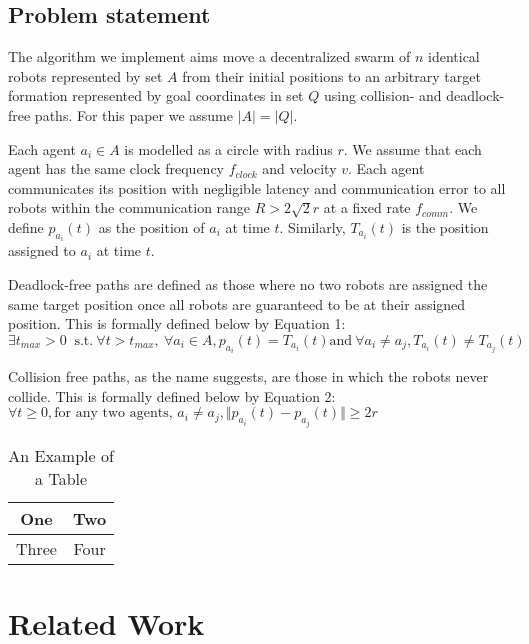 \subsection{Problem statement}

The algorithm we implement aims move a decentralized swarm of $n$ identical robots represented by set $A$ from their initial positions to an arbitrary target formation represented by goal coordinates in set $Q$ using collision- and deadlock-free paths. For this paper we assume $|A| = |Q|$.

Each agent $a_{i} \in A$ is modelled as a circle with radius $r$. We assume that each agent has the same clock frequency $f_{clock}$ and velocity $v$. Each agent communicates its position with negligible latency and communication error to all robots within the communication range $R > 2\sqrt{2}r$ at a fixed rate $f_{comm}$. We define $p_{a_{i}}(t)$ as the position of $a_i$ at time $t$. Similarly, $T_{a_{i}}(t)$ is the position assigned to $a_i$ at time $t$.

Deadlock-free paths are defined as those where no two robots are assigned the same target position once all robots are guaranteed to be at their assigned position. This is formally defined below by Equation 1: $ \exists t_{max} > 0 \ \text{ s.t.} \ \forall t > t_{max}, \ \forall a_{i} \in A, p_{a_{i}}(t) = T_{a_{i}}(t) \text{and} \ \forall a_i \neq a_j, T_{a_{i}}(t) \neq T_{a_{j}}(t) $

Collision free paths, as the name suggests, are those in which the robots never collide. This is formally defined below by Equation 2:
$
 \forall t \geq 0, {} \mbox{for any two agents, } a_i \neq a_j , \Vert p_{a_i}(t) - p_{a_j}(t) \Vert \geq 2r $


\begin{table}
\caption{An Example of a Table}
\label{table_example}
\begin{center}
\begin{tabular}{|c||c|}
\hline
One & Two\\
\hline
Three & Four\\
\hline
\end{tabular}
\end{center}
\end{table}


\section{Related Work}

